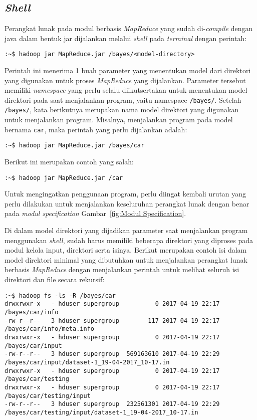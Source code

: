 \subsection{\textit{Shell}}
Perangkat lunak pada modul berbasis \textit{MapReduce} yang sudah di-\textit{compile} dengan java dalam bentuk jar dijalankan melalui \textit{shell} pada \textit{terminal} dengan perintah:
\begin{lstlisting}
:~$ hadoop jar MapReduce.jar /bayes/<model-directory>
\end{lstlisting}
Perintah ini menerima 1 buah parameter yang menentukan model dari direktori yang digunakan untuk proses \textit{MapReduce} yang dijalankan. Parameter tersebut memiliki \textit{namespace} yang perlu selalu diikutsertakan untuk menentukan model direktori pada saat menjalankan program, yaitu namespace \texttt{/bayes/}. Setelah \texttt{/bayes/}, kata berikutnya merupakan nama model direktori yang digunakan untuk menjalankan program. Misalnya, menjalankan program pada model bernama \texttt{car}, maka perintah yang perlu dijalankan adalah:
\begin{lstlisting}
:~$ hadoop jar MapReduce.jar /bayes/car
\end{lstlisting}
Berikut ini merupakan contoh yang salah:
\begin{lstlisting}
:~$ hadoop jar MapReduce.jar /car
\end{lstlisting}

Untuk mengingatkan penggunaan program, perlu diingat kembali urutan yang perlu dilakukan untuk menjalankan keseluruhan perangkat lunak dengan benar pada \textit{modul specification} Gambar~\ref{fig:Modul Specification}. 

Di dalam model direktori yang dijadikan parameter saat menjalankan program menggunakan \textit{shell}, sudah harus memiliki beberapa direktori yang diproses pada modul kelola input, direktori serta isinya. Berikut merupakan contoh isi dalam model direktori minimal yang dibutuhkan untuk menjalankan perangkat lunak berbasis \textit{MapReduce} dengan menjalankan perintah untuk melihat seluruh isi direktori dan file secara rekursif:
\begin{lstlisting}
:~$ hadoop fs -ls -R /bayes/car
drwxrwxr-x   - hduser supergroup          0 2017-04-19 22:17 /bayes/car/info
-rw-r--r--   3 hduser supergroup        117 2017-04-19 22:17 /bayes/car/info/meta.info
drwxrwxr-x   - hduser supergroup          0 2017-04-19 22:17 /bayes/car/input
-rw-r--r--   3 hduser supergroup  569163610 2017-04-19 22:29 /bayes/car/input/dataset-1_19-04-2017_10-17.in
drwxrwxr-x   - hduser supergroup          0 2017-04-19 22:17 /bayes/car/testing
drwxrwxr-x   - hduser supergroup          0 2017-04-19 22:17 /bayes/car/testing/input
-rw-r--r--   3 hduser supergroup  232561301 2017-04-19 22:29 /bayes/car/testing/input/dataset-1_19-04-2017_10-17.in
\end{lstlisting}

